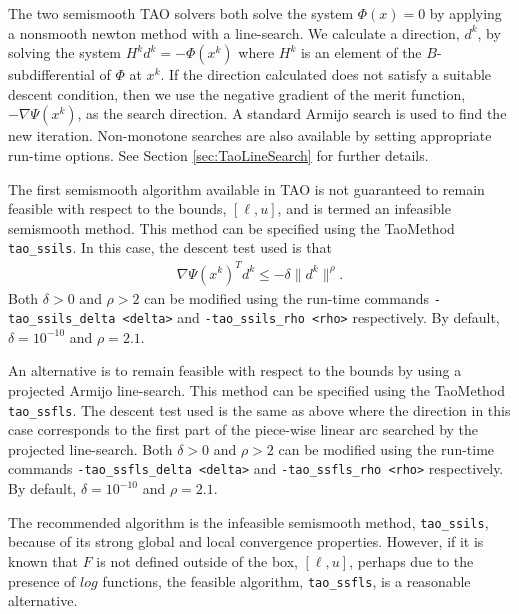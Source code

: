 The two semismooth TAO solvers both solve the system $\Phi(x) = 0$ by applying
a nonsmooth newton method with a line-search.  We calculate a direction, $d^k$,
by solving the system $H^kd^k = -\Phi(x^k)$ where $H^k$ is an element of the 
$B$-subdifferential \cite{qi.sun:nonsmooth} of $\Phi$ at $x^k$.  If the 
direction calculated does not satisfy a suitable descent condition, then 
we use the negative gradient of the merit function, $-\nabla \Psi(x^k)$, as 
the search direction.  A standard Armijo search \cite{armijo:minimization} is
used to find the new iteration.  Non-monotone searches 
\cite{grippo.lampariello.ea:nonmonotone} are also available by setting 
appropriate run-time options.  See Section \ref{sec:TaoLineSearch} for further 
details.

The first semismooth algorithm available in TAO is not guaranteed to 
remain feasible with respect to the bounds, $[\ell, u]$, and is termed 
an infeasible semismooth method.  This method can be specified using the 
TaoMethod {\tt tao\_ssils}.  In this case, the descent test used is 
that
\begin{eqnarray*}
\nabla \Psi(x^k)^Td^k \leq -\delta\| d^k \|^\rho.
\end{eqnarray*}
Both $\delta > 0$ and $\rho > 2$ can be modified using the
run-time commands {\tt -tao\_ssils\_delta <delta>} and 
{\tt -tao\_ssils\_rho <rho>} respectively. By default, 
$\delta = 10^{-10}$ and $\rho = 2.1$.

An alternative is to remain feasible with respect to the bounds by using a 
projected Armijo line-search.  This method can be specified using the 
TaoMethod {\tt tao\_ssfls}.  The descent test used is the same as above 
where the direction in this case corresponds to the first part of the 
piece-wise linear arc searched by the projected line-search.  
Both $\delta > 0$ and $\rho > 2$ can be modified using the run-time 
commands  {\tt -tao\_ssfls\_delta <delta>} and {\tt -tao\_ssfls\_rho <rho>} 
respectively.  By default, $\delta = 10^{-10}$ and $\rho = 2.1$.

The recommended algorithm is the infeasible semismooth method,
{\tt tao\_ssils}, because of its strong global and local convergence 
properties.  However, if it is known that $F$ is not defined outside 
of the box, $[\ell,u]$, perhaps due to the presence of $log$ functions,
the feasible algorithm, {\tt tao\_ssfls}, is a reasonable alternative.

